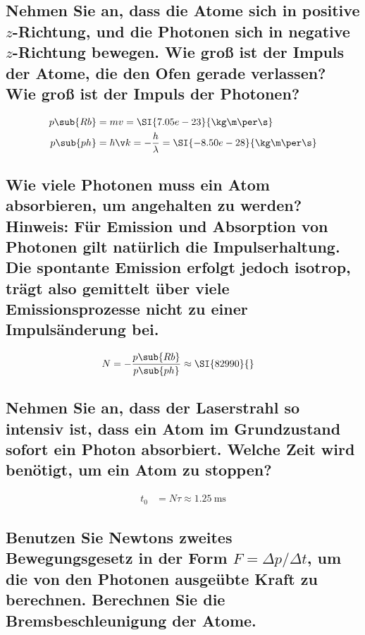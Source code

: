 \documentclass[ex]{exercise_4.1}
\begin{document}
\subsection{Nehmen Sie an, dass die Atome sich in positive $z$-Richtung, und die Photonen sich in negative $z$-Richtung bewegen. Wie groß ist der Impuls der Atome, die den Ofen gerade verlassen? Wie groß ist der Impuls der
Photonen?}

\dottedlinete

\begin{align*}
    p\sub{Rb} &= m v = \SI{7.05e-23}{\kg\m\per\s}\\
    p\sub{ph} &= \hbar \v k = -\frac h \lambda = \SI{-8.50e-28}{\kg\m\per\s}
\end{align*}

\subsection{Wie viele Photonen muss ein Atom absorbieren, um angehalten zu werden?\\
Hinweis: Für Emission und Absorption von Photonen gilt natürlich die Impulserhaltung. Die spontante Emission erfolgt jedoch isotrop, trägt also gemittelt über viele Emissionsprozesse nicht zu einer Impulsänderung bei.}

\dottedlinete

\begin{align*}
    N &= -\frac{p\sub{Rb}}{p\sub{ph}}
    \approx \SI{82990}{}
\end{align*}

\subsection{Nehmen Sie an, dass der Laserstrahl so intensiv ist, dass ein Atom im Grundzustand sofort ein Photon
absorbiert. Welche Zeit wird benötigt, um ein Atom zu stoppen?}

\dottedlinete

\begin{align*}
    t_0 &= N \tau \approx \SI{1.25}{\ms}
\end{align*}

\subsection{Benutzen Sie Newtons zweites Bewegungsgesetz in der Form $F =  \Delta p / \Delta t$, um die von den Photonen ausgeübte Kraft zu berechnen. Berechnen Sie die Bremsbeschleunigung der Atome.}
\end{document}
